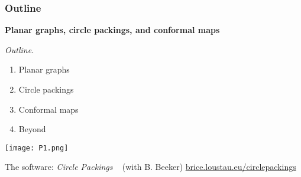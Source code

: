   
\begin{frame}
\frametitle{Outline}
    
\begin{center}
{\large \bfseries Planar graphs, circle packings, and conformal maps}
\end{center}
    

\bigskip \bigskip

\begin{minipage}{0.40\textwidth}

\emph{Outline.}
\bigskip

\begin{enumerate}[1., itemsep=1.0ex]
\item Planar graphs
\item Circle packings
\item Conformal maps
\item Beyond
\end{enumerate}
\end{minipage}%
\hfill \pause
\begin{minipage}{0.60\textwidth}

\begin{center}
\texttt{[image: P1.png]}
\end{center}

The software: \emph{Circle Packings} ~ (with B. Beeker) \newline
\href{https://www.brice.loustau.eu/circlepackings/indexen.html}{brice.loustau.eu/circlepackings} \newline


\end{minipage}%



\end{frame}

